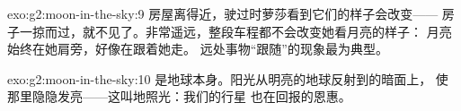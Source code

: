 \begin{solution}{exo:g2:moon-in-the-sky:9}
房屋离得近，驶过时萝莎看到它们的样子会改变——
房子一掠而过，就不见了。非常遥远，整段车程都不会改变她看月亮的样子：
月亮始终在她肩旁，好像在跟着她走。
远处事物“跟随”的现象最为典型。
\end{solution}

\begin{solution}{exo:g2:moon-in-the-sky:10}
是地球本身。阳光从明亮的地球反射到的暗面上，
使那里隐隐发亮——这叫地照光：我们的行星
也在回报的恩惠。
\end{solution}
